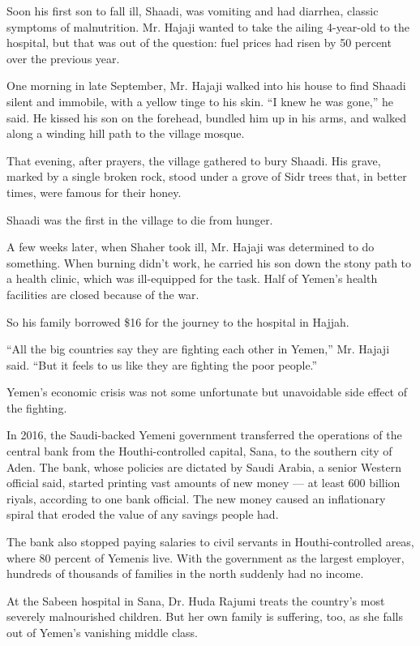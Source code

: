 Soon his first son to fall ill, Shaadi, was vomiting and had diarrhea,
classic symptoms of malnutrition. Mr. Hajaji wanted to take the ailing
4-year-old to the hospital, but that was out of the question: fuel
prices had risen by 50 percent over the previous year.

One morning in late September, Mr. Hajaji walked into his house to find
Shaadi silent and immobile, with a yellow tinge to his skin. ``I knew he
was gone,'' he said. He kissed his son on the forehead, bundled him up
in his arms, and walked along a winding hill path to the village mosque.

That evening, after prayers, the village gathered to bury Shaadi. His
grave, marked by a single broken rock, stood under a grove of Sidr trees
that, in better times, were famous for their honey.

Shaadi was the first in the village to die from hunger.

A few weeks later, when Shaher took ill, Mr. Hajaji was determined to do
something. When burning didn't work, he carried his son down the stony
path to a health clinic, which was ill-equipped for the task. Half of
Yemen's health facilities are closed because of the war.

So his family borrowed \$16 for the journey to the hospital in Hajjah.

``All the big countries say they are fighting each other in Yemen,'' Mr.
Hajaji said. ``But it feels to us like they are fighting the poor
people.''

Yemen's economic crisis was not some unfortunate but unavoidable side
effect of the fighting.

In 2016, the Saudi-backed Yemeni government transferred the operations
of the central bank from the Houthi-controlled capital, Sana, to the
southern city of Aden. The bank, whose policies are dictated by Saudi
Arabia, a senior Western official said, started printing vast amounts of
new money --- at least 600 billion riyals, according to one bank
official. The new money caused an inflationary spiral that eroded the
value of any savings people had.

The bank also stopped paying salaries to civil servants in
Houthi-controlled areas, where 80 percent of Yemenis live. With the
government as the largest employer, hundreds of thousands of families in
the north suddenly had no income.

At the Sabeen hospital in Sana, Dr. Huda Rajumi treats the country's
most severely malnourished children. But her own family is suffering,
too, as she falls out of Yemen's vanishing middle class.

